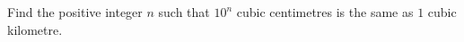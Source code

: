 Find the positive integer $n$ such that $10^n$ cubic centimetres is the same as $1$ cubic kilometre.
